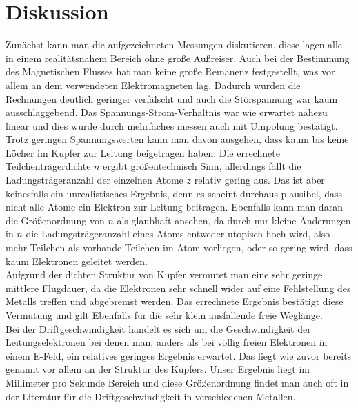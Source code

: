 \section{Diskussion}

Zunächst kann man die aufgezeichneten Messungen diskutieren, diese lagen alle in einem realitätsnahem Bereich ohne große Außreiser.
Auch bei der Bestimmung des Magnetischen Flusses hat man keine große Remanenz festgestellt, was vor allem an dem verwendeten Elektromagneten lag.
Dadurch wurden die Rechnungen deutlich geringer verfälscht und auch die Störspannung war kaum ausschlaggebend.
Das Spannungs-Strom-Verhältnis war wie erwartet nahezu linear und dies wurde durch mehrfaches messen auch mit Umpolung bestätigt.
\\
Trotz geringen Spannungswerten kann man davon ausgehen, dass kaum bis keine Löcher im Kupfer zur Leitung beigetragen haben. 
Die errechnete Teilchenträgerdichte $n$ ergibt größentechnisch Sinn, allerdings fällt die Ladungsträgeranzahl der einzelnen Atome $z$
relativ gering aus. Das ist aber keinesfalls ein unrealistisches Ergebnis, denn es scheint durchaus plausibel, dass nicht alle Atome ein Elektron zur Leitung
beitragen. Ebenfalls kann man daran die Größenordnung von $n$ als glaubhaft ansehen, da durch nur kleine Änderungen in $n$ die Ladungsträgeranzahl eines Atoms entweder utopisch hoch wird, 
also mehr Teilchen als vorhande Teilchen im Atom vorliegen, oder so gering wird, dass kaum Elektronen geleitet werden.
\\
Aufgrund der dichten Struktur von Kupfer vermutet man eine sehr geringe mittlere Flugdauer, da die Elektronen sehr schnell wider auf eine Fehlstellung des
Metalls treffen und abgebremst werden. Das errechnete Ergebnis bestätigt diese Vermutung und gilt Ebenfalls für die sehr klein ausfallende freie Weglänge.
\\
Bei der Driftgeschwindigkeit handelt es sich um die Geschwindigkeit der Leitungselektronen bei denen man, anders als bei völlig freien Elektronen in einem E-Feld, ein relatives geringes
Ergebnis erwartet. Das liegt wie zuvor bereits genannt vor allem an der Struktur des Kupfers. 
Unser Ergebnis liegt im Millimeter pro Sekunde Bereich und diese Größenordnung findet man auch oft in der Literatur für die Driftgeschwindigkeit in verschiedenen Metallen.
